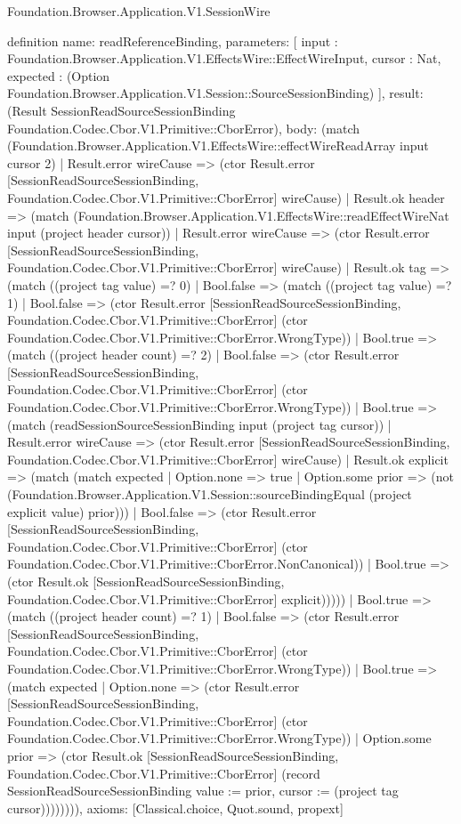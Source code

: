 \begin{lexlean}{Foundation.Browser.Application.V1.SessionWire}
\begin{semanticmodule}
definition{
  name: readReferenceBinding,
  parameters: [
    input : Foundation.Browser.Application.V1.EffectsWire::EffectWireInput,
    cursor : Nat,
    expected : (Option Foundation.Browser.Application.V1.Session::SourceSessionBinding)
  ],
  result: (Result SessionReadSourceSessionBinding Foundation.Codec.Cbor.V1.Primitive::CborError),
  body: (match (Foundation.Browser.Application.V1.EffectsWire::effectWireReadArray input cursor 2)
    | Result.error wireCause => (ctor Result.error [SessionReadSourceSessionBinding, Foundation.Codec.Cbor.V1.Primitive::CborError] wireCause)
    | Result.ok header => (match (Foundation.Browser.Application.V1.EffectsWire::readEffectWireNat input (project header cursor))
      | Result.error wireCause => (ctor Result.error [SessionReadSourceSessionBinding, Foundation.Codec.Cbor.V1.Primitive::CborError] wireCause)
      | Result.ok tag => (match ((project tag value) =? 0)
        | Bool.false => (match ((project tag value) =? 1)
          | Bool.false => (ctor Result.error [SessionReadSourceSessionBinding, Foundation.Codec.Cbor.V1.Primitive::CborError] (ctor Foundation.Codec.Cbor.V1.Primitive::CborError.WrongType))
          | Bool.true => (match ((project header count) =? 2)
            | Bool.false => (ctor Result.error [SessionReadSourceSessionBinding, Foundation.Codec.Cbor.V1.Primitive::CborError] (ctor Foundation.Codec.Cbor.V1.Primitive::CborError.WrongType))
            | Bool.true => (match (readSessionSourceSessionBinding input (project tag cursor))
              | Result.error wireCause => (ctor Result.error [SessionReadSourceSessionBinding, Foundation.Codec.Cbor.V1.Primitive::CborError] wireCause)
              | Result.ok explicit => (match (match expected
                  | Option.none => true
                  | Option.some prior => (not (Foundation.Browser.Application.V1.Session::sourceBindingEqual (project explicit value) prior)))
                | Bool.false => (ctor Result.error [SessionReadSourceSessionBinding, Foundation.Codec.Cbor.V1.Primitive::CborError] (ctor Foundation.Codec.Cbor.V1.Primitive::CborError.NonCanonical))
                | Bool.true => (ctor Result.ok [SessionReadSourceSessionBinding, Foundation.Codec.Cbor.V1.Primitive::CborError] explicit)))))
        | Bool.true => (match ((project header count) =? 1)
          | Bool.false => (ctor Result.error [SessionReadSourceSessionBinding, Foundation.Codec.Cbor.V1.Primitive::CborError] (ctor Foundation.Codec.Cbor.V1.Primitive::CborError.WrongType))
          | Bool.true => (match expected
            | Option.none => (ctor Result.error [SessionReadSourceSessionBinding, Foundation.Codec.Cbor.V1.Primitive::CborError] (ctor Foundation.Codec.Cbor.V1.Primitive::CborError.WrongType))
            | Option.some prior => (ctor Result.ok [SessionReadSourceSessionBinding, Foundation.Codec.Cbor.V1.Primitive::CborError] (record SessionReadSourceSessionBinding {value := prior, cursor := (project tag cursor)}))))))),
  axioms: [Classical.choice, Quot.sound, propext]
}


\end{semanticmodule}
\end{lexlean}
